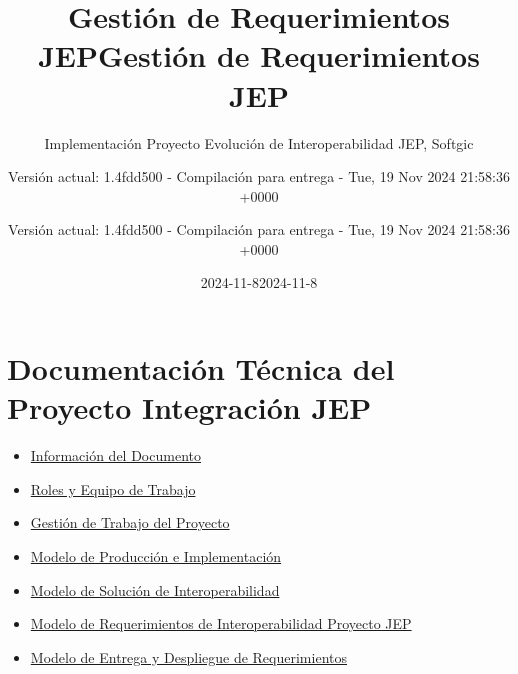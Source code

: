 \documentclass[
  paper=a4,
  ,captions=tableheading
]{scrartcl}
\title{Gestión de Requerimientos JEP}
\subtitle{Implementación Proyecto Evolución de Interoperabilidad JEP,
Softgic}
\author{Versión actual: 1.4fdd500 - Compilación para entrega - Tue, 19
Nov 2024 21:58:36 +0000}
\date{2024-11-8}
\title{Gestión de Requerimientos JEP}
\author{Versión actual: 1.4fdd500 - Compilación para entrega - Tue, 19
Nov 2024 21:58:36 +0000}
\date{2024-11-8}
\providecommand{\tightlist}{%
  \setlength{\itemsep}{0pt}\setlength{\parskip}{0pt}}
\begin{document}
\begin{titlepage}
\newcommand{\colorRule}[3][black]{\textcolor[HTML]{#1}{\rule{#2}{#3}}}
\end{titlepage}
\restoregeometry
{}




\section{Documentación Técnica del Proyecto Integración
JEP}\label{sec:documentaciuxf3n-tuxe9cnica-del-proyecto-integraciuxf3n-jep}

\begin{itemize}
\tightlist
\item
  \hyperref[informaciuxf3n-del-documento]{Información del Documento}
\item
  \hyperref[roles-y-equipo-de-trabajo]{Roles y Equipo de Trabajo}
\item
  \hyperref[gestiuxf3n-de-trabajo-del-proyecto]{Gestión de Trabajo del
  Proyecto}
\item
  \hyperref[modelo-de-producciuxf3n-e-implementaciuxf3n]{Modelo de
  Producción e Implementación}
\item
  \hyperref[modelo-de-soluciuxf3n-de-interoperabilidad]{Modelo de
  Solución de Interoperabilidad}
\item
  \hyperref[modelo-de-requerimientos-de-interoperabilidad-proyecto-jep]{Modelo
  de Requerimientos de Interoperabilidad Proyecto JEP}
\item
  \hyperref[modelo-de-entrega-y-despliegue-de-requerimientos]{Modelo de
  Entrega y Despliegue de Requerimientos}
\end{itemize}
\end{document}
